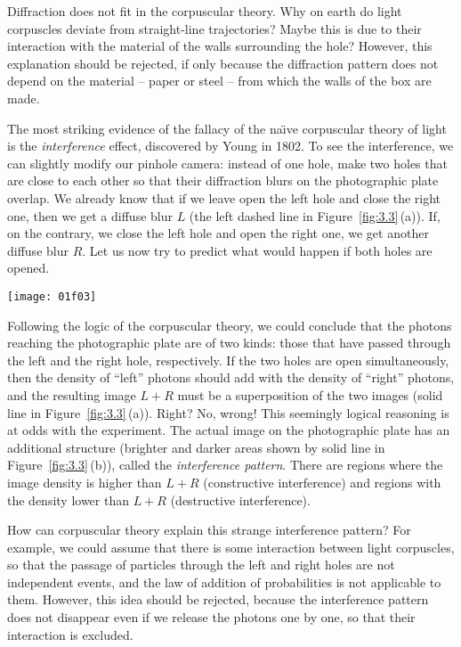 \documentclass[nochecklpage]{stefan1}
\theoremstyle{definition}
\begin{document}
Diffraction does not fit in the corpuscular theory. Why on earth do
light corpuscles deviate from straight-line trajectories? Maybe this is
due to their interaction with the material of the walls surrounding the
hole? However, this explanation should be rejected, if only because the
diffraction pattern does not depend on the material -- paper or steel
-- from which the walls of the box are made.

The most striking evidence of the fallacy of the na\"{\i }ve corpuscular
theory of light is the \emph{interference} effect,
discovered by Young in 1802. To see the interference, we can slightly
modify our pinhole camera: instead of one hole, make two holes that are
close to each other so that their diffraction blurs on the photographic
plate overlap. We already know that if we leave open the left hole and
close the right one, then we get a diffuse blur $ L $ (the left dashed
line in Figure~\ref{fig:3.3}\,(a)). If, on the contrary, we close the left
hole and open the right one, we get another diffuse blur $ R $. Let us
now try to predict what would happen if both holes are opened.

\begin{SCfigure}[50][h]
\texttt{[image: 01f03]}
\caption{Image density in a two-hole camera. (a) In the na\"{\i }ve corpuscular
theory. (b) In reality.}
\label{fig:3.3}
\end{SCfigure}

Following the logic of the corpuscular theory, we could conclude that
the photons reaching the photographic plate are of two kinds: those that
have passed through the left and the right hole, respectively. If the
two holes are open simultaneously, then the density of ``left'' photons
should add with the density of ``right'' photons, and the resulting
image $ L + R $ must be a superposition of the two images (solid line
in Figure~\ref{fig:3.3}\,(a)). Right? No, wrong! This seemingly logical
reasoning is at odds with the experiment. The actual image on the
photographic plate has an additional structure (brighter and darker
areas shown by solid line in Figure~\ref{fig:3.3}\,(b)), called the \emph{interference pattern}. There are regions where the image density is higher
than $ L + R $ (constructive interference) and regions with the density
lower than $ L + R $ (destructive interference).

How can corpuscular theory explain this strange interference pattern?
For example, we could assume that there is some interaction between
light corpuscles, so that the passage of particles through the left and
right holes are not independent events, and the law of addition of
probabilities is not applicable to them. However, this idea should be
rejected, because the interference pattern does not disappear even if
we release the photons one by one, so that their interaction is excluded.
\end{document}
